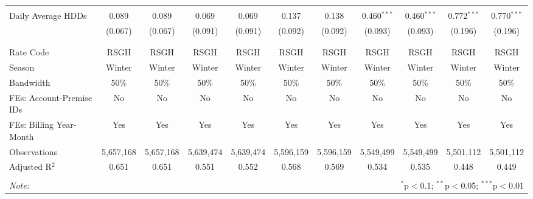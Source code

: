 \begin{table}[!htbp]
\begin{tabular}{@{\extracolsep{5pt}}lcccccccccc}
  & & & & & & & & & & \\ 
 Daily Average HDDs & 0.089 & 0.089 & 0.069 & 0.069 & 0.137 & 0.138 & 0.460$^{***}$ & 0.460$^{***}$ & 0.772$^{***}$ & 0.770$^{***}$ \\ 
  & (0.067) & (0.067) & (0.091) & (0.091) & (0.092) & (0.092) & (0.093) & (0.093) & (0.196) & (0.196) \\ 
  & & & & & & & & & & \\ 
\hline \\[-1.8ex] 
Rate Code & RSGH & RSGH & RSGH & RSGH & RSGH & RSGH & RSGH & RSGH & RSGH & RSGH \\ 
Season & Winter & Winter & Winter & Winter & Winter & Winter & Winter & Winter & Winter & Winter \\ 
Bandwidth & 50\% & 50\% & 50\% & 50\% & 50\% & 50\% & 50\% & 50\% & 50\% & 50\% \\ 
FEs: Account-Premise IDs & No & No & No & No & No & No & No & No & No & No \\ 
FEs: Billing Year-Month & Yes & Yes & Yes & Yes & Yes & Yes & Yes & Yes & Yes & Yes \\ 
Observations & 5,657,168 & 5,657,168 & 5,639,474 & 5,639,474 & 5,596,159 & 5,596,159 & 5,549,499 & 5,549,499 & 5,501,112 & 5,501,112 \\ 
Adjusted R$^{2}$ & 0.651 & 0.651 & 0.551 & 0.552 & 0.568 & 0.569 & 0.534 & 0.535 & 0.448 & 0.449 \\ 
\hline 
\hline \\[-1.8ex] 
\textit{Note:}  & \multicolumn{10}{r}{$^{*}$p$<$0.1; $^{**}$p$<$0.05; $^{***}$p$<$0.01} \\ 
\end{tabular} 
\end{table} 
